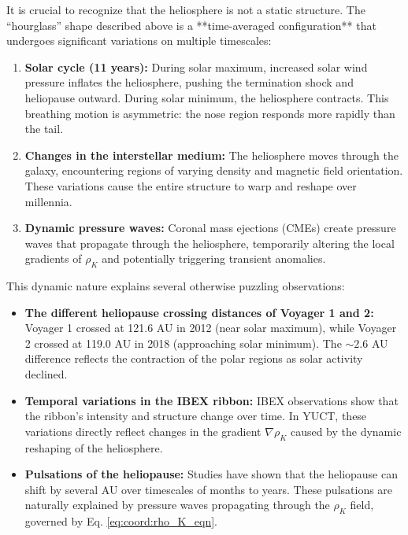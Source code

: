 \documentclass[12pt,a4paper]{article}
\theoremstyle{remark}
\begin{document}
	It is crucial to recognize that the heliosphere is not a static structure. The ``hourglass'' shape described above is a **time-averaged configuration** that undergoes significant variations on multiple timescales:
	
	\begin{enumerate}
		\item \textbf{Solar cycle (11 years):} During solar maximum, increased solar wind pressure inflates the heliosphere, pushing the termination shock and heliopause outward. During solar minimum, the heliosphere contracts. This breathing motion is asymmetric: the nose region responds more rapidly than the tail.
		
		\item \textbf{Changes in the interstellar medium:} The heliosphere moves through the galaxy, encountering regions of varying density and magnetic field orientation. These variations cause the entire structure to warp and reshape over millennia.
		
		\item \textbf{Dynamic pressure waves:} Coronal mass ejections (CMEs) create pressure waves that propagate through the heliosphere, temporarily altering the local gradients of \(\rho_K\) and potentially triggering transient anomalies.
	\end{enumerate}
	
	This dynamic nature explains several otherwise puzzling observations:
	\begin{itemize}
		\item \textbf{The different heliopause crossing distances of Voyager 1 and 2:} Voyager 1 crossed at 121.6 AU in 2012 (near solar maximum), while Voyager 2 crossed at 119.0 AU in 2018 (approaching solar minimum). The \(\sim2.6\) AU difference reflects the contraction of the polar regions as solar activity declined.
		
		\item \textbf{Temporal variations in the IBEX ribbon:} IBEX observations show that the ribbon's intensity and structure change over time. In YUCT, these variations directly reflect changes in the gradient $\nabla \rho_K$ caused by the dynamic reshaping of the heliosphere.
		
		\item \textbf{Pulsations of the heliopause:} Studies have shown that the heliopause can shift by several AU over timescales of months to years. These pulsations are naturally explained by pressure waves propagating through the $\rho_K$ field, governed by Eq. \eqref{eq:coord:rho_K_eqn}.
	\end{itemize}
	
\end{document}
